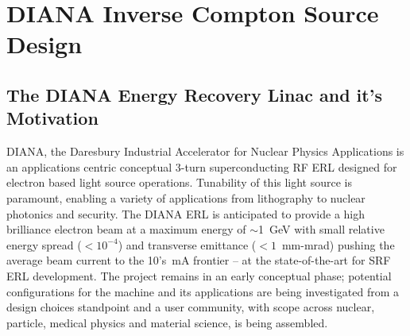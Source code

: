 \documentclass[../main.tex]{subfiles}
\begin{document}
\chapter{DIANA Inverse Compton Source Design}
\label{DIANA_Inverse_Compton_Source_Design} %

\section{The DIANA Energy Recovery Linac and it's Motivation}

DIANA, the Daresbury Industrial Accelerator for Nuclear Physics Applications is an applications centric conceptual 3-turn superconducting RF ERL designed for electron based light source operations. Tunability of this light source is paramount, enabling a variety of applications from lithography to nuclear photonics and security. The DIANA ERL is anticipated to provide a high brilliance electron beam at a maximum energy of $\sim$1~\si{\giga\electronvolt} with small relative energy spread ($< 10^{-4}$) and transverse emittance ($< 1$~\si{\milli\meter}-\si{\milli\radian}) pushing the average beam current to the 10's~\si{\milli\ampere} frontier -- at the state-of-the-art for SRF ERL development. The project remains in an early conceptual phase; potential configurations for the machine and its applications are being investigated from a design choices standpoint and a user community, with scope across nuclear, particle, medical physics and material science, is being assembled.  
\end{document}
